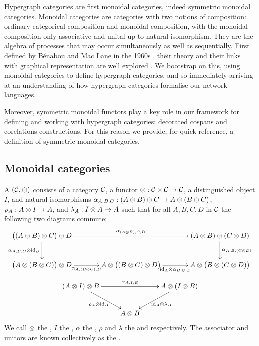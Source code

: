 Hypergraph categories are first monoidal categories, indeed symmetric monoidal
categories.  Monoidal categories are categories with two notions of composition:
ordinary categorical composition and monoidal composition, with the monoidal
composition only associative and unital up to natural isomorphism. They are the
algebra of processes that may occur simultaneously as well as sequentially.
First defined by B\'enabou and Mac Lane in the 1960s \cite{Ben63, Mac63}, their
theory and their links with graphical representation are well explored
\cite{JS91, Sel11}. We bootstrap on this, using monoidal categories to define
hypergraph categories, and so immediately arriving at an understanding of how
hypergraph categories formalise our network languages. 

Moreover, symmetric monoidal functors play a key role in our framework for
defining and working with hypergraph categories: decorated cospans and
corelations constructions. For this reason we provide, for quick reference, a
definition of symmetric monoidal categories.


\subsection{Monoidal categories}
A  $({\mathcal{C}}, \otimes)$ consists of a category ${\mathcal{C}}$, a
functor $\otimes: {\mathcal{C}} \times {\mathcal{C}} \to {\mathcal{C}}$, a distinguished object $I$, and natural
isomorphisms $\alpha_{A,B,C}: (A \otimes B) \otimes C \to A \otimes (B \otimes C)$,
$\rho_A: A \otimes I  \to A$, and $\lambda_A: I \otimes A \to A$ such that for all
$A,B,C,D$ in $\mathcal C$ the following two diagrams commute: 
\[
  \xymatrixcolsep{3pc}
  \xymatrix{
    \big((A \ot B) \ot C\big) \ot D \ar[d]_{\a_{A,B,C}\ot\idn_D} \ar[rr]^{\a_{(A\ot B),C,D}} 
    &&(A \ot B) \ot (C \ot D) \ar[d]^{\a_{A,B,(C\ot D)}} \\
    \big(A \ot (B\ot C)\big) \ot D \ar[r]_{\a_{A,(B\ot C),D}} 
    & A\ot\big((B \ot C)\ot D\big)\ar[r]_{\idn_A \ot \a_{B,C,D}}
    &A \ot \big(B \ot (C \ot D)\big)
  }
\]
\[
  \xymatrix{
    (A\ot I)\ot B  \ar[rr]^{\a_{A,I,B}} \ar[dr]_{\rho_{A}\ot \idn_B} && A \ot (I \ot B) \ar[dl]^{\idn_A\ot \lambda_B}\\
    & A \ot B \\
  }
\]
We call $\otimes$ the , $I$ the ,
$\alpha$ the , $\rho$ and $\lambda$ the  and
 respectively. The associator and unitors are known
collectively as the .

